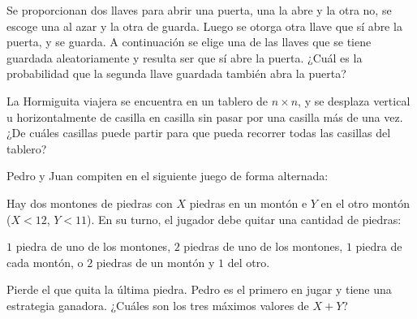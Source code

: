 \begin{problem}
Se proporcionan dos llaves para abrir una puerta,
una la abre y la otra no, se escoge una al azar
y la otra de guarda.
Luego se otorga otra llave que sí abre la puerta,
y se guarda.
A continuación se elige una de las llaves que
se tiene guardada aleatoriamente y resulta ser que sí
abre la puerta. ¿Cuál es la probabilidad que
la segunda llave guardada también abra la puerta?
\end{problem}

\begin{problem}[OMAPA 2012/2]
La Hormiguita viajera se encuentra en
un tablero de $n \times n$, y se desplaza
vertical u horizontalmente
de casilla en casilla sin pasar por una casilla más
de una vez.
¿De cuáles casillas puede partir para que pueda
recorrer todas las casillas del tablero?
\end{problem}

\begin{problem}[OMAPA 2013/4]
Pedro y Juan compiten en el siguiente
juego de forma alternada:
\begin{itemize}
	\ii Hay dos montones de piedras con $X$
	piedras en un montón e $Y$ en el otro montón ($X < 12$, $Y < 11$).
	\ii En su turno, el jugador debe quitar una
	cantidad de piedras:
	\begin{itemize}
		\ii $1$ piedra de uno de los montones,
		\ii $2$ piedras de uno de los montones,
		\ii $1$ piedra de cada montón, o
		\ii $2$ piedras de un montón y $1$ del otro.
	\end{itemize}
	Pierde el que quita la última piedra.
	Pedro es el primero en jugar y tiene una
	estrategia ganadora.
	¿Cuáles son los tres máximos valores de $X + Y$?
\end{itemize}
\end{problem}

